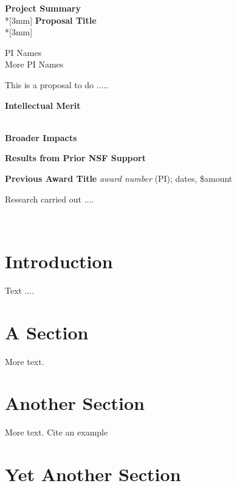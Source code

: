 \documentclass{proposal}
\begin{document}
\begin{center}
{\Large{\bf Project Summary}}\\*[3mm]
{\bf Proposal Title} \\*[3mm]

PI Names \\
More PI Names

\end{center}


This is a  proposal to do .....



\noindent
{\bf Intellectual Merit}

\ \\

\noindent
{\bf Broader Impacts}

\renewcommand{\thepage} {B--\arabic{page}}

\newpage


\renewcommand{\thepage} {D--\arabic{page}}

\newpage

\centerline{\bf Results from Prior NSF Support}

\noindent
{\bf Previous Award Title}
{\it award number} (PI); dates, \$amount

Research carried out ....

\ \\


\section{Introduction}

Text ....

\section{A Section}

More text.

\section{Another Section}

More text.  Cite an example \cite[]{sample_ref}

\section{Yet Another Section}
\end{document}

